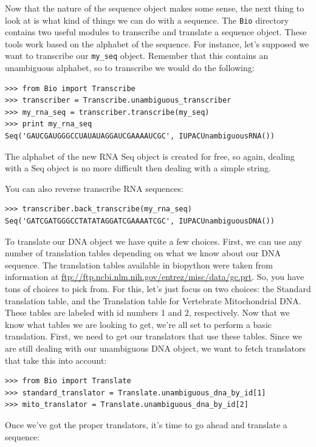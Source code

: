 \documentclass{report}
\begin{document}
Now that the nature of the sequence object makes some sense, the next
thing to look at is what kind of things we can do with a sequence. The
\verb|Bio| directory contains two useful modules to transcribe and
translate a sequence object. These tools work based on the alphabet of
the sequence. For instance, let's supposed we want to transcribe our
\verb|my_seq| object. Remember that this contains an unambiguous
alphabet, so to transcribe we would do the following:

\begin{verbatim}
>>> from Bio import Transcribe
>>> transcriber = Transcribe.unambiguous_transcriber
>>> my_rna_seq = transcriber.transcribe(my_seq)
>>> print my_rna_seq
Seq('GAUCGAUGGGCCUAUAUAGGAUCGAAAAUCGC', IUPACUnambiguousRNA())
\end{verbatim}

The alphabet of the new RNA Seq object is created for free, so again, dealing with a Seq object is no more difficult then dealing with a simple string.

You can also reverse transcribe RNA sequences:

\begin{verbatim}
>>> transcriber.back_transcribe(my_rna_seq)
Seq('GATCGATGGGCCTATATAGGATCGAAAATCGC', IUPACUnambiguousDNA())
\end{verbatim}

To translate our DNA object we have quite a few choices. First, we can use any number of translation tables depending on what we know about our DNA sequence. The translation tables available in biopython were taken from information at \url{ftp://ftp.ncbi.nlm.nih.gov/entrez/misc/data/gc.prt}. So, you have tons of choices to pick from. For this, let's just focus on two choices: the Standard translation table, and the Translation table for Vertebrate Mitochondrial DNA. These tables are labeled with id numbers 1 and 2, respectively. Now that we know what tables we are looking to get, we're all set to perform a basic translation. First, we need to get our translators that use these tables. Since we are still dealing with our unambiguous DNA object, we want to fetch translators that take this into account:

\begin{verbatim}
>>> from Bio import Translate
>>> standard_translator = Translate.unambiguous_dna_by_id[1] 
>>> mito_translator = Translate.unambiguous_dna_by_id[2]
\end{verbatim}

Once we've got the proper translators, it's time to go ahead and translate a sequence:
\end{document}

